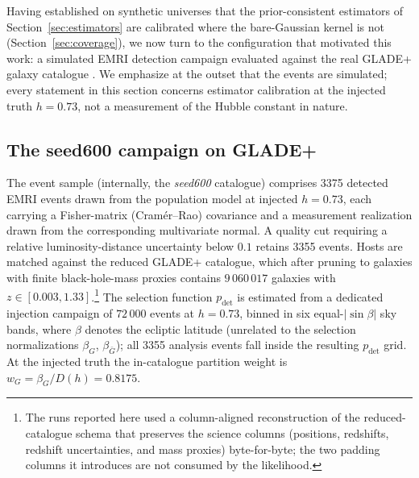 Having established on synthetic universes that the prior-consistent estimators of Section~\ref{sec:estimators} are calibrated where the bare-Gaussian kernel is not (Section~\ref{sec:coverage}), we now turn to the configuration that motivated this work: a simulated EMRI detection campaign evaluated against the real GLADE+ galaxy catalogue \citep{Dalya:2021ewn}. We emphasize at the outset that the events are simulated; every statement in this section concerns estimator calibration at the injected truth $h = 0.73$, not a measurement of the Hubble constant in nature.

\subsection{The seed600 campaign on GLADE+}

The event sample (internally, the \textit{seed600} catalogue) comprises 3375 detected EMRI events drawn from the population model at injected $h = 0.73$, each carrying a Fisher-matrix (Cram\'er--Rao) covariance and a measurement realization drawn from the corresponding multivariate normal. %
A quality cut requiring a relative luminosity-distance uncertainty below $0.1$ retains 3355 events. %
Hosts are matched against the reduced GLADE+ catalogue, which after pruning to galaxies with finite black-hole-mass proxies contains $9\,060\,017$ galaxies with $z \in [0.003, 1.33]$.\footnote{The runs reported here used a column-aligned reconstruction of the reduced-catalogue schema that preserves the science columns (positions, redshifts, redshift uncertainties, and mass proxies) byte-for-byte; the two padding columns it introduces are not consumed by the likelihood. %
} %
The selection function $p_\mathrm{det}$ is estimated from a dedicated injection campaign of $72\,000$ events at $h = 0.73$, binned in six equal-$|\sin\beta|$ sky bands, where $\beta$ denotes the ecliptic latitude (unrelated to the selection normalizations $\beta_G$, $\beta_{\bar G}$); all 3355 analysis events fall inside the resulting $p_\mathrm{det}$ grid. %
At the injected truth the in-catalogue partition weight is $w_G = \beta_G/D(h) = 0.8175$. %

